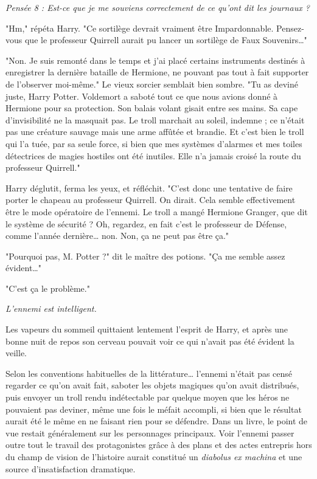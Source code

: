 \emph{Pensée 8 : Est-ce que je me souviens correctement de ce qu'ont dit les journaux ?} 

"Hm," répéta Harry. "Ce sortilège devrait vraiment être Impardonnable. Pensez-vous que le professeur Quirrell aurait pu lancer un sortilège de Faux Souvenirs…"

"Non. Je suis remonté dans le temps et j'ai placé certains instruments destinés à enregistrer la dernière bataille de Hermione, ne pouvant pas tout à fait supporter de l'observer moi-même." Le vieux sorcier semblait bien sombre. "Tu as deviné juste, Harry Potter. Voldemort a saboté tout ce que nous avions donné à Hermione pour sa protection. Son balais volant gisait entre ses mains. Sa cape d'invisibilité ne la masquait pas. Le troll marchait au soleil, indemne ; ce n'était pas une créature sauvage mais une arme affûtée et brandie. Et c'est bien le troll qui l'a tuée, par sa seule force, si bien que mes systèmes d'alarmes et mes toiles détectrices de magies hostiles ont été inutiles. Elle n'a jamais croisé la route du professeur Quirrell."

Harry déglutit, ferma les yeux, et réfléchit. "C'est donc une tentative de faire porter le chapeau au professeur Quirrell. On dirait. Cela semble effectivement être le mode opératoire de l'ennemi. Le troll a mangé Hermione Granger, que dit le système de sécurité ? Oh, regardez, en fait c'est le professeur de Défense, comme l'année dernière… non. Non, ça ne peut pas être ça."

"Pourquoi pas, M. Potter ?" dit le maître des potions. "Ça me semble assez évident…"

"C'est ça le problème."

\emph{L'ennemi est intelligent.} 

Les vapeurs du sommeil quittaient lentement l'esprit de Harry, et après une bonne nuit de repos son cerveau pouvait voir ce qui n'avait pas été évident la veille.

Selon les conventions habituelles de la littérature… l'ennemi n'était pas censé regarder ce qu'on avait fait, saboter les objets magiques qu'on avait distribués, puis envoyer un troll rendu indétectable par quelque moyen que les héros ne pouvaient pas deviner, même une fois le méfait accompli, si bien que le résultat aurait été le même en ne faisant rien pour se défendre. Dans un livre, le point de vue restait généralement sur les personnages principaux. Voir l'ennemi passer outre tout le travail des protagonistes grâce à des plans et des actes entrepris hors du champ de vision de l'histoire aurait constitué un \emph{diabolus ex machina}  et une source d'insatisfaction dramatique.

